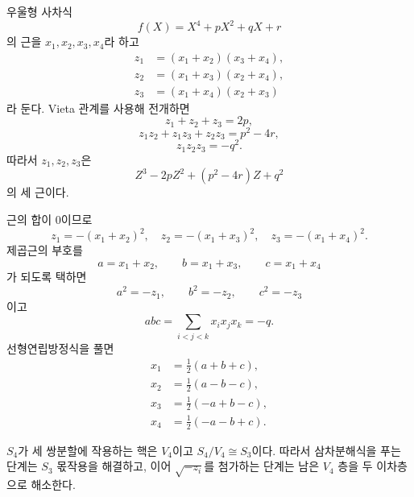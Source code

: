 \begin{solution}
우울형 사차식
\[
  f(X)=X^4+pX^2+qX+r
\]
의 근을 $x_1,x_2,x_3,x_4$라 하고
\[
\begin{aligned}
 z_1&=(x_1+x_2)(x_3+x_4),\\
 z_2&=(x_1+x_3)(x_2+x_4),\\
 z_3&=(x_1+x_4)(x_2+x_3)
\end{aligned}
\]
라 둔다. Vieta 관계를 사용해 전개하면
\[
  z_1+z_2+z_3=2p,
\]
\[
  z_1z_2+z_1z_3+z_2z_3=p^2-4r,
\]
\[
  z_1z_2z_3=-q^2.
\]
따라서 $z_1,z_2,z_3$은
\[
  \boxed{Z^3-2pZ^2+(p^2-4r)Z+q^2}
\]
의 세 근이다.

근의 합이 $0$이므로
\[
  z_1=-(x_1+x_2)^2,
  \quad z_2=-(x_1+x_3)^2,
  \quad z_3=-(x_1+x_4)^2.
\]
제곱근의 부호를
\[
  a=x_1+x_2,
  \qquad b=x_1+x_3,
  \qquad c=x_1+x_4
\]
가 되도록 택하면
\[
  a^2=-z_1,\qquad b^2=-z_2,\qquad c^2=-z_3
\]
이고
\[
  abc=\sum_{i<j<k}x_ix_jx_k=-q.
\]
선형연립방정식을 풀면
\[
\begin{aligned}
 x_1&=\frac12(a+b+c),\\
 x_2&=\frac12(a-b-c),\\
 x_3&=\frac12(-a+b-c),\\
 x_4&=\frac12(-a-b+c).
\end{aligned}
\]

$S_4$가 세 쌍분할에 작용하는 핵은 $V_4$이고
$S_4/V_4\cong S_3$이다. 따라서 삼차분해식을 푸는 단계는 $S_3$
몫작용을 해결하고, 이어 $\sqrt{-z_i}$를 첨가하는 단계는 남은
$V_4$ 층을 두 이차층으로 해소한다.
\end{solution}
